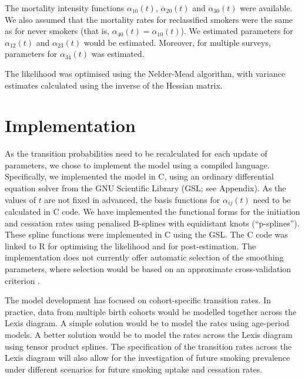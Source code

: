 \documentclass[11pt,a4paper]{article}
\begin{document}
The mortality intensity functions $\alpha_{10}(t)$, $\alpha_{20}(t)$
and $\alpha_{30}(t)$ were available. We also assumed that the
mortality rates for reclassified smokers were the same as for never
smokers (that is, $\alpha_{40}(t)=\alpha_{10}(t)$). We estimated
parameters for $\alpha_{12}(t)$ and $\alpha_{23}(t)$ would be
estimated. Moreover, for multiple surveys, parameters for
$\alpha_{34}(t)$ was estimated.

The likelihood was optimised using the Nelder-Mead algorithm, with variance estimates calculated using the inverse of the Hessian matrix.



\section{Implementation}

As the transition probabilities need to be recalculated for each
update of parameters, we chose to implement the model using a compiled
language. Specifically, we implemented the model in C, using an
ordinary differential equation solver from the GNU Scientific Library
(GSL; see Appendix). As the values of $t$ are not fixed in advanced,
the basis functions for $\alpha_{ij}(t)$ need to be calculated in C
code.  We have implemented the functional forms for the initiation and
cessation rates using penalised B-splines with equidistant knots
(``p-splines''). These spline functions were implemented in C using
the GSL.  The C code was linked to R for optimising the likelihood and
for post-estimation.  The implementation does not currently offer
automatic selection of the smoothing parameters, where selection would
be based on an approximate cross-validation criterion
\cite[e.g.][]{joly_penalized_2002,cai_hazard_2003}.

The model development has focused on cohort-specific transition rates.
In practice, data from multiple birth cohorts would be modelled
together across the Lexis diagram. A simple solution would be to model
the rates using age-period models. A better solution would be to model
the rates across the Lexis diagram using tensor product splines.
The specification of the transition rates across the Lexis diagram
will also allow for the investigation of future smoking prevalence
under different scenarios for future smoking uptake and cessation rates.
\end{document}
